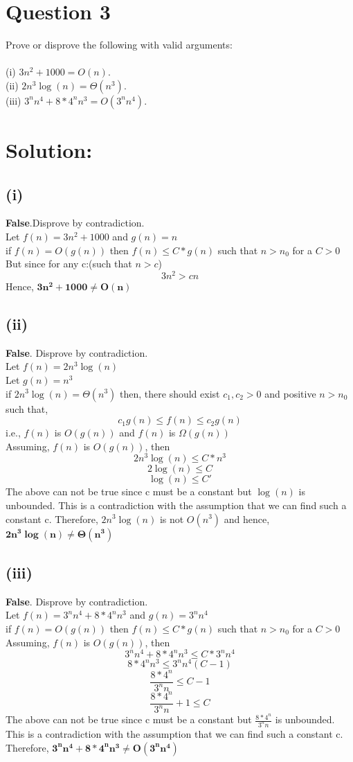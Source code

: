 \documentclass[12pt, letterpaper]{article}
\begin{document}
\section*{Question 3}
 Prove or disprove the following with valid arguments:\\\\(i) $3n^{2}+ 1000 =O(n)$.
\\(ii) $2n^{3}\log ({n}) = \Theta(n^{3})$.
\\(iii) $3^{n}n^{4}+ 8 * 4^{n}n^{3}=O(3^{n}n^{4})$.
\section*{Solution:}
\subsection*{(i)} \textbf{False}.Disprove by contradiction.\\ Let $f(n) = 3n^{2} + 1000$ and $g(n) = n$ \\ if $f(n) = O(g(n))$ then $f(n) \leq C * g(n)$ such that $n>n_0$ for a $C>0$
	\\But since for any c:(such that $n>c$)$$3n^{2} > cn$$  Hence, $\bm{3n^{2} + 1000 \neq O(n)}$
\subsection*{(ii)} \textbf{False}. Disprove by contradiction.
\\Let $f(n) = 2n^{3} \log (n)$ \\ Let $g(n) = n^{3}$
\\ if $2n^{3}\log ({n}) = \Theta(n^{3})$ then, there should exist $c_1, c_2 >0$ and positive $n>n_0$ such that, $$ c_1 g(n) \leq f(n) \leq c_2 g(n) $$ i.e., $f(n)$ is $O(g(n))$ and $f(n)$ is $\Omega(g(n))$
\\Assuming, $f(n)$ is $O(g(n))$, then $$2n^{3} \log (n) \leq C * n^{3}$$ $$2 \log (n) \leq C $$ $$\log (n) \leq C' $$ The above can not be true since c must be a constant but $\log (n)$ is unbounded. This is a contradiction with the assumption that we can find such a constant c. Therefore, $2n^{3}\log ({n})$ is not $O(n^{3})$ and hence, $\bm{2n^{3}\log ({n}) \neq \Theta(n^{3})}$
\subsection*{(iii)} \textbf{False}. Disprove by contradiction.
\\ Let $f(n) = 3^{n}n^{4} + 8 * 4^{n}n^{3}$ and $g(n) = 3^{n}n^{4}$ \\ if $f(n) = O(g(n))$ then $f(n) \leq C * g(n)$ such that $n>n_0$ for a $C>0$
	\\Assuming, $f(n)$ is $O(g(n))$, then $$ 3^{n}n^{4} + 8 * 4^{n}n^{3} \leq C * 3^{n}n^{4} $$ $$ 8 * 4^{n}n^{3} \leq  3^{n}n^{4}(C - 1)$$ $$\frac{8 * 4^{n}}{3^{n}n} \leq C - 1 $$ $$ \frac{8 * 4^{n}}{3^{n}n} + 1 \leq C $$
The above can not be true since c must be a constant but $ \frac{8 * 4^{n}}{3^{n}n}$ is unbounded. This is a contradiction with the assumption that we can find such a constant c. Therefore, $\bm{3^{n}n^{4} + 8 * 4^{n}n^{3} \neq O(3^{n}n^{4})}$
\end{document}
